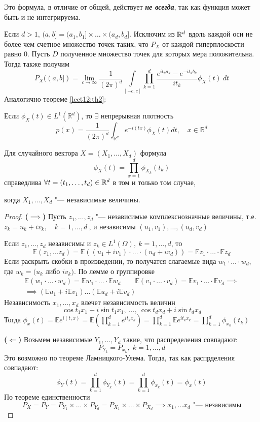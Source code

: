 \begin{nb}
    Это формула, в отличие от общей, действует \textbf{\emph{не всегда}}, так как функция может быть и не интегрируема.
\end{nb}
Если $d > 1$, $(a, b] = (a_1, b_1]\times\ldots\times(a_d, b_d]$. Исключим из $\mathbb{R}^d$ вдоль каждой оси не более чем счетное множество точек таких, что $P_X$ от каждой гиперплоскости равно 0. Пусть $D$ полученное множество точек для которых мера положительна. Тогда также получим
$$P_X((a, b] ) = \lim_{c\to \infty} \frac{1}{(2\pi)^d}\int\limits_{[-c, c]} \prod_{k=1}^{d} \frac{e^{it_ka_k} - e^{-it_kb_k}}{it_k} \phi_X(t) \:dt$$
Аналогично теореме \ref{lect12:th2}:

Если $\phi_X(t) \in L^1(\mathbb{R}^d)$, то $\exists$ непрерывная плотность
$$p(x) = \frac{1}{(2\pi)^d}\int_{\mathbb{R}^d} e^{-i(tx)}\phi_X(t)dt, \quad x\in \mathbb{R}^d $$
\begin{theorem} \label{lect12:th3}
    Для случайного вектора $X = (X_1, \ldots, X_d)$ формула
    $$\phi_X(t) = \prod_{x=1}^d \phi_{X_k} (t_k)$$
    справедлива $\forall t = (t_1, \ldots, t_d) \in \mathbb{R}^d$ в том и только том случае, 

    когда $X_1, \ldots, X_d$ "--- независимые величины.
\begin{proof}
    \textbf{($\implies$)} Пусть $z_1, \ldots, z_d$ "--- независимые комплекснозначные величины, т.е. $z_k = u_k + iv_k,\quad k = 1,\ldots,d\:$, и независимы $(u_1, v_1),\ldots,(u_d, v_d)$

    Если $z_1, \ldots, z_d$ независимы и $z_k \in L^1(\Omega), \:k = 1,\ldots, d$, то
    $$\mathbb{E}(z_1, \ldots z_d) = \mathbb{E}((u_1 + iv_1)\cdot \ldots \cdot (u_d + iv_d)) = \mathbb{E}z_1 \cdot \ldots \cdot \mathbb{E}z_d$$
    Если раскрыть скобки в произведении, то получатся слагаемые вида $w_1 \cdot \ldots \cdot w_d$, где $w_k = (u_k$ либо $iv_k)$. По лемме о группировке
    \begin{gather*}
        \mathbb{E} (w_1\cdot \ldots \cdot w_d) = \mathbb{E} w_1 \cdot \ldots \cdot \mathbb{E}w_d \qquad \mathbb{E} (v_1\cdot \ldots \cdot v_d) = \mathbb{E} v_1 \cdot \ldots \cdot \mathbb{E}v_d \implies\\
        \implies(\mathbb{E}u_1 + i\mathbb{E}v_1) \ldots (\mathbb{E}u_d + i\mathbb{E}v_d)
    \end{gather*}
    Независимость $x_1, \ldots, x_d$ влечет независимость величин $$\cos{t_1x_1} + i\sin{t_1x_1}, \:\ldots,\:\cos{t_dx_d} + i\sin{t_dx_d}$$
    Тогда $\phi_x(t) = \mathbb{E} e^{i(t,x)} = \mathbb{E}\left( \prod\limits_{k=1}^d e^{it_kx_k}\right) = \prod\limits_{k=1}^d \mathbb{E} e^{it_kx_k} = \prod\limits_{k=1}^d \phi_{x_k}(t_k)$

    \textbf{($\Leftarrow$)} Возьмем независимые $Y_1, \ldots, Y_d$ такие, что распределения совпадают: $$P_{Y_k} = P_{x_k}, \; k = 1, \ldots, d$$
    Это возможно по теореме Ламницкого-Улема. Тогда, так как распрделения совпадают:
    $$\phi_{Y}(t) = \prod\limits_{k=1}^d \phi_{Y_k}(t) = \prod\limits_{k=1}^d \phi_{x_k}(t) = \phi_x(t)$$
    По теореме единственности $$P_X = P_Y = P_{Y_1} \times \ldots\times P_{Y_d} = P_{X_1} \times \ldots \times P_{X_d} \implies x_1, \ldots x_d \mbox{ "--- независимы}$$
\end{proof}
\end{theorem}
